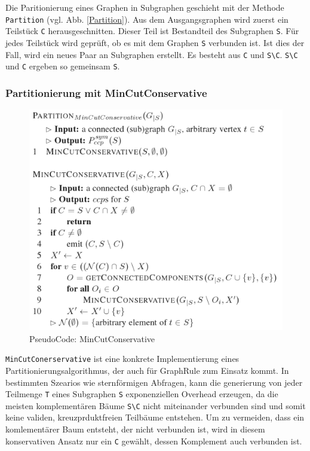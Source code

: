 {Die Paritionierung eines Graphen in Subgraphen geschieht mit der Methode \texttt{Partition} (vgl. Abb. \ref{Partition}). Aus dem Ausgangsgraphen wird zuerst ein Teilstück \texttt{C} herausgeschnitten. Dieser Teil ist Bestandteil des Subgraphen \texttt{S}. Für jedes Teilstück wird geprüft, ob es mit dem Graphen \texttt{S} verbunden ist. Ist dies der Fall, wird ein neues Paar an Subgraphen erstellt. Es besteht aus \texttt{C} und  \texttt{S\textbackslash C}. \texttt{S\textbackslash C} und \texttt{C} ergeben so gemeinsam \texttt{S}.


\subsubsection{Partitionierung mit MinCutConservative}

\begin{figure}[ht]
  \centering
  \includegraphics[scale=0.5]{03_Regeln/00_media/MinCutConservative.png}
  \caption{PseudoCode: MinCutConservative}
  \label{MinCutConservative}
\end{figure}

\texttt{MinCutConerservative} ist eine konkrete Implementierung eines Partitionierungsalgorithmus, der auch für GraphRule zum Einsatz kommt. In bestimmten Szearios wie sternförmigen Abfragen, kann die generierung von jeder Teilmenge \texttt{T} eines Subgraphen \texttt{S} exponenziellen Overhead erzeugen, da die meisten komplementären Bäume \texttt{S\textbackslash C} nicht miteinander verbunden sind und somit keine validen, kreuzprduktfreien Teilbäume entstehen. Um zu vermeiden, dass ein komlementärer Baum entsteht, der nicht verbunden ist, wird in diesem konservativen Ansatz nur ein \texttt{C} gewählt, dessen Komplement auch verbunden ist. 







}
